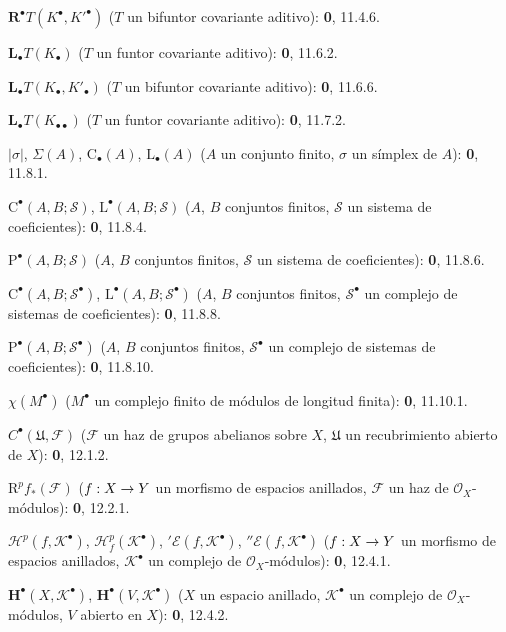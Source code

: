 \documentclass[10pt,oneside,openany]{book}
\theoremstyle{egaenv}\newtheorem*{env}{---}
\theoremstyle{egastatement}
\theoremstyle{egadescription}
\renewcommand{\to}{\mathchoice{\longrightarrow}{\rightarrow}{\rightarrow}{\rightarrow}}
\begin{document}
\begin{flushleft}
$\mathbf R^\bullet T(K^\bullet,K'^{\bullet})$ ($T$ un bifuntor covariante
aditivo): \textbf 0, 11.4.6.

$\mathbf L_\bullet T(K_\bullet)$ ($T$ un funtor covariante aditivo): \textbf 0, 11.6.2.

$\mathbf L_\bullet T(K_\bullet,K'_\bullet)$ ($T$ un bifuntor covariante
aditivo): \textbf 0, 11.6.6.

$\mathbf L_\bullet T(K_{\bullet\bullet})$ ($T$ un funtor covariante aditivo):
\textbf 0, 11.7.2.

$|\sigma|$, $\Sigma(A)$, $\mathrm C_\bullet(A)$, $\mathrm L_\bullet(A)$
($A$ un conjunto finito, $\sigma$ un símplex de $A$): \textbf 0, 11.8.1.

$\mathrm C^\bullet(A,B;\mathscr S)$, $\mathrm L^\bullet(A,B;\mathscr S)$
($A$, $B$ conjuntos finitos, $\mathscr S$ un sistema de coeficientes): \textbf 0, 11.8.4.

$\mathrm P^\bullet(A,B;\mathscr S)$ ($A$, $B$ conjuntos finitos, $\mathscr S$ un
sistema de coeficientes): \textbf 0, 11.8.6.

$\mathrm C^\bullet(A,B;\mathscr S^\bullet)$,
$\mathrm L^\bullet(A,B;\mathscr S^\bullet)$ ($A$, $B$ conjuntos finitos,
$\mathscr S^\bullet$ un complejo de sistemas de coeficientes): \textbf 0, 11.8.8.

$\mathrm P^\bullet(A,B;\mathscr S^\bullet)$ ($A$, $B$ conjuntos finitos,
$\mathscr S^\bullet$ un complejo de sistemas de coeficientes): \textbf 0, 11.8.10.

$\chi(M^\bullet)$ ($M^\bullet$ un complejo finito de módulos de longitud finita):
\textbf 0, 11.10.1.

$C^\bullet(\mathfrak U,\mathcal F)$ ($\mathcal F$ un haz de grupos abelianos
sobre $X$, $\mathfrak U$ un recubrimiento abierto de $X$): \textbf 0, 12.1.2.

$\mathrm R^pf_*(\mathcal F)$ ($f:X\to Y$ un morfismo de espacios anillados,
$\mathcal F$ un haz de $\mathcal O_X$-módulos): \textbf 0, 12.2.1.

$\mathscr H^p(f,\mathcal K^\bullet)$,
$\mathscr H_f^p(\mathcal K^\bullet)$, ${}'\mathcal E(f,\mathcal K^\bullet)$,
${}''\mathcal E(f,\mathcal K^\bullet)$ ($f:X\to Y$ un morfismo de espacios anillados,
$\mathcal K^\bullet$ un complejo de $\mathcal O_X$-módulos): \textbf 0, 12.4.1.

$\mathbf H^\bullet(X,\mathcal K^\bullet)$,
$\mathbf H^\bullet(V,\mathcal K^\bullet)$ ($X$ un espacio anillado,
$\mathcal K^\bullet$ un complejo de $\mathcal O_X$-módulos, $V$ abierto en $X$):
\textbf 0, 12.4.2.


\end{flushleft}
\end{document}
